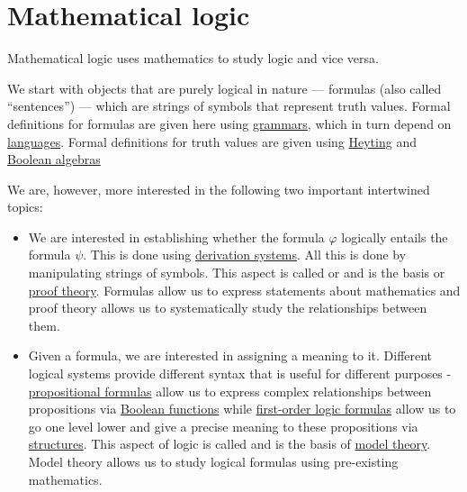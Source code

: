 \section{Mathematical logic}\label{sec:mathematical_logic}

Mathematical logic uses mathematics to study logic and vice versa.

We start with objects that are purely logical in nature --- formulas (also called \enquote{sentences}) --- which are strings of symbols that represent truth values. Formal definitions for formulas are given here using \hyperref[def:grammar]{grammars}, which in turn depend on \hyperref[def:language]{languages}. Formal definitions for truth values are given using \hyperref[def:heyting_algebra]{Heyting} and \hyperref[def:boolean_algebra]{Boolean algebras}

We are, however, more interested in the following two important intertwined topics:
\begin{itemize}
  \item We are interested in establishing whether the formula \( \varphi \) logically entails the formula \( \psi \). This is done using \hyperref[def:first_order_derivation_system]{derivation systems}. All this is done by manipulating strings of symbols. This aspect is called  or  and is the basis or \hyperref[def:first_order_derivability]{proof theory}. Formulas allow us to express statements about mathematics and proof theory allows us to systematically study the relationships between them.

  \item Given a formula, we are interested in assigning a meaning to it. Different logical systems provide different syntax that is useful for different purposes - \hyperref[def:propositional_syntax/formula]{propositional formulas} allow us to express complex relationships between propositions via \hyperref[subsec:boolean_functions]{Boolean functions} while \hyperref[def:first_order_syntax/formula]{first-order logic formulas} allow us to go one level lower and give a precise meaning to these propositions via \hyperref[def:first_order_structure]{structures}. This aspect of logic is called  and is the basis of \hyperref[subsec:first_order_models]{model theory}. Model theory allows us to study logical formulas using pre-existing mathematics.
\end{itemize}


